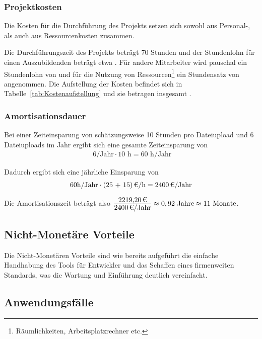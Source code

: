 \subsubsection{Projektkosten}
\label{sec:Projektkosten}
Die Kosten für die Durchführung des Projekts setzen sich sowohl aus Personal-, als auch aus Ressourcenkosten zusammen.

Die Durchführungszeit des Projekts beträgt 70 Stunden und der Stundenlohn für einen Auszubildenden beträgt etwa . Für andere Mitarbeiter wird pauschal ein Stundenlohn von  und für die Nutzung von Ressourcen\footnote{Räumlichkeiten, Arbeitsplatzrechner etc.}
ein Stundensatz von  angenommen. 
Die Aufstellung der Kosten befindet sich in Tabelle~\ref{tab:Kostenaufstellung} und sie betragen insgesamt .


\subsubsection{Amortisationsdauer}
\label{sec:Amortisationsdauer}

Bei einer Zeiteinsparung von schätzungsweise 10 Stunden pro Dateiupload und 6 Dateiuploads im Jahr ergibt sich eine gesamte Zeiteinsparung von 
\begin{eqnarray}
\mbox{ 6/Jahr} \cdot 10 \mbox{ h} = 60 \mbox{ h/Jahr} 
\end{eqnarray}

Dadurch ergibt sich eine jährliche Einsparung von 
\begin{eqnarray}
60 \mbox{h/Jahr} \cdot \eur{(25 + 15)}{\mbox{/h}} = \eur{2400}\mbox{/Jahr}
\end{eqnarray}

Die Amortisationszeit beträgt also $\frac{\eur{2219,20}}{\eur{2400}\mbox{/Jahr}} \approx 0,92 \mbox{ Jahre} \approx 11 \mbox{ Monate}$.


\subsection{Nicht-Monetäre Vorteile}
Die Nicht-Monetären Vorteile sind wie bereits aufgeführt die einfache Handhabung des Tools für Entwickler und das Schaffen eines firmenweiten Standards, was die Wartung und Einführung deutlich vereinfacht.


\subsection{Anwendungsfälle}
\label{sec:Anwendungsfaelle}

